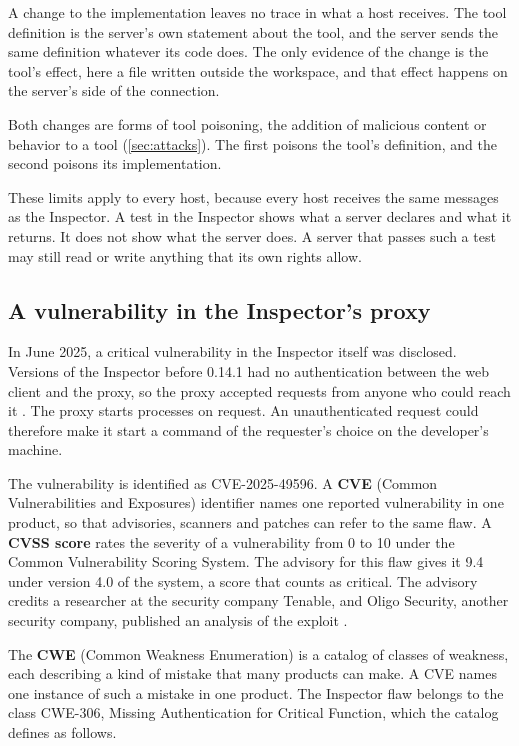 A change to the implementation leaves no trace in what a host receives. The tool definition is the
server's own statement about the tool, and the server sends the same definition whatever its code
does. The only evidence of the change is the tool's effect, here a file written outside the
workspace, and that effect happens on the server's side of the connection.

Both changes are forms of tool poisoning, the addition of malicious content or behavior to a tool
(\cref{sec:attacks}). The first poisons the tool's definition, and the second poisons its
implementation.

These limits apply to every host, because every host receives the same messages as the Inspector.
A test in the Inspector shows what a server declares and what it returns. It does not show what the
server does. A server that passes such a test may still read or write anything that its own rights
allow.

\subsection{A vulnerability in the Inspector's proxy}
\label{sec:inspector-cve}

In June 2025, a critical vulnerability in the Inspector itself was disclosed. Versions of the
Inspector before 0.14.1 had no authentication between the web client and the proxy, so the proxy
accepted requests from anyone who could reach it \citep{ghsa-7f8r-inspector}. The proxy starts
processes on request. An unauthenticated request could therefore make it start a command of the
requester's choice on the developer's machine.

The vulnerability is identified as CVE-2025-49596. A \textbf{CVE} (Common Vulnerabilities and
Exposures) identifier names one reported vulnerability in one product, so that advisories, scanners
and patches can refer to the same flaw. A \textbf{CVSS score} rates the severity of a vulnerability
from 0 to 10 under the Common Vulnerability Scoring System. The advisory for this flaw gives it 9.4
under version 4.0 of the system, a score that counts as critical. The advisory credits a researcher
at the security company Tenable, and Oligo Security, another security company, published an
analysis of the exploit \citep{lumelsky2025inspector}.

The \textbf{CWE} (Common Weakness Enumeration) is a catalog of classes of weakness, each describing
a kind of mistake that many products can make. A CVE names one instance of such a mistake in one
product. The Inspector flaw belongs to the class CWE-306, Missing Authentication for Critical
Function, which the catalog defines as follows.

